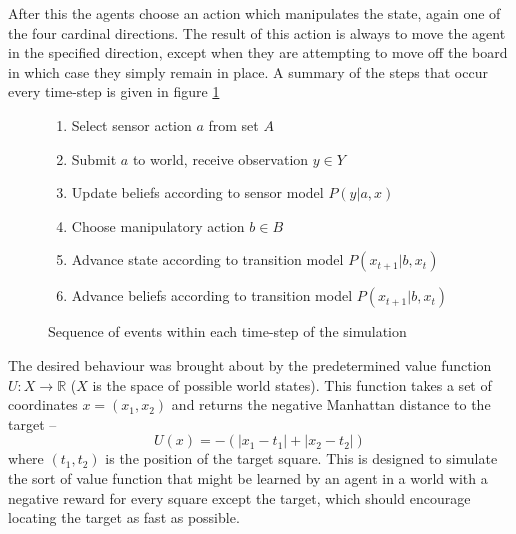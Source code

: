 \documentclass{article}
\begin{document}
After this the agents choose an action which manipulates the state, again one of the 
four cardinal directions. The result of this action is always to move the agent in the 
specified direction, except when they are attempting to move off the board in which case 
they simply remain in place. A summary of the steps that occur every time-step is 
given in figure \ref{fig:timestep}

\begin{figure}
\centering
\sffamily

\begin{enumerate}
	\item {Select sensor action \(a\) from set \(A\)}
	\item {Submit \(a\) to world, receive observation \(y \in Y\)}
	\item {Update beliefs according to sensor model \(P(y | a,x)\)}
	\item {Choose manipulatory action \(b \in B\)}
	\item {Advance state according to transition model \(P(x_{t+1} | b, x_t)\)}
	\item {Advance beliefs according to transition model \(P(x_{t+1} | b, x_t)\)}
\end{enumerate}

\caption{Sequence of events within each time-step of the simulation}
\label{fig:timestep}
\end{figure}

The desired behaviour was brought about by the predetermined value function 
\(U \colon X \to\mathbb{R}\) (\(X\) is the space of possible world states).
This function takes a set of coordinates \(x = (x_1, x_2)\) and returns the negative
Manhattan distance to the target --
\[
	U(x) = -(|x_1 - t_1| + |x_2 - t_2|)
\] where \((t_1, t_2)\) is the position of the target square. This is designed to 
simulate the sort of value function that might be learned by an agent in a world 
with a negative reward for every square except the target, which should encourage
locating the target as fast as possible.
\end{document}
